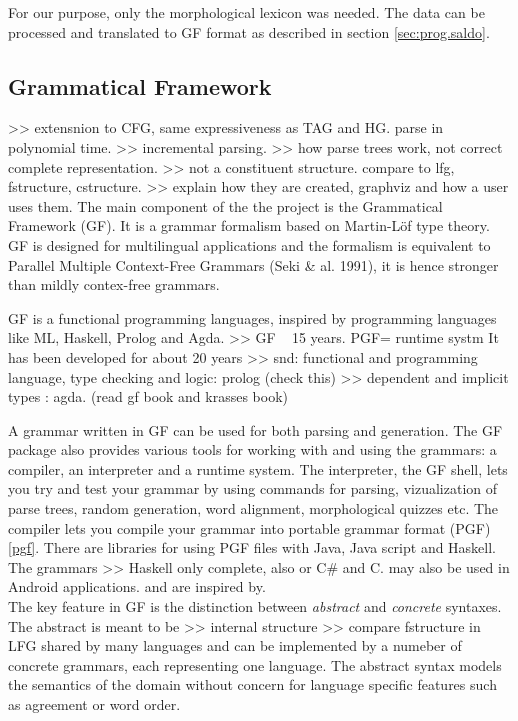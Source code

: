 \documentclass{report}
\begin{document}
For our purpose, only the morphological lexicon was needed.
The data can be processed and translated to GF format as described in 
section \ref{sec:prog.saldo}.

\subsection{Grammatical Framework}
>> extensnion to CFG, same expressiveness as TAG and HG. parse in polynomial time.
>> incremental parsing.
>> how parse trees work, not correct complete representation.
>> not a constituent structure. compare to lfg, fstructure, cstructure.
>> explain how they are created, graphviz and how a user uses them.
The main component of the the project is the Grammatical Framework\cite{gfbok} (GF). It is
a grammar formalism based on Martin-Löf type theory\cite{martinlof}. GF is
designed for multilingual applications and the formalism is equivalent to
Parallel Multiple Context-Free Grammars (Seki \& al. 1991), it is hence
stronger than mildly contex-free grammars. 

GF is a functional programming languages, inspired by programming languages
like ML\cite{ml}, Haskell\cite{haskell}, Prolog\cite{bratko} and
Agda\cite{agda}. 
>> GF ~ 15 years. PGF= runtime systm
It has been developed for about 20 years 
>> snd: functional and programming language, type checking and logic: prolog (check this)
>> dependent and implicit types : agda. (read gf book and krasses book)

A grammar written in GF can be used for both parsing and generation.
The GF package also provides various tools for working with and using the grammars:
a compiler, an interpreter and a runtime system. The interpreter, the GF shell, lets
you try and test your grammar by using commands for parsing, vizualization of parse trees,
random generation, word alignment, morphological quizzes etc.
The compiler lets you compile your grammar into portable grammar format (PGF)\ref{pgf}.
There are libraries for using PGF files with Java, Java script and Haskell. The grammars
>> Haskell only complete, also or C\# and C. 
may also be used in Android applications.
and are inspired by.\\


The key feature in GF is the distinction between
\textit{abstract} and \textit{concrete} syntaxes. The abstract is meant to be
>> internal structure
>> compare fstructure in LFG
shared by many languages and can be implemented by a numeber of concrete grammars,
each representing one language. The abstract syntax models the semantics of the
domain without concern for language specific features such as agreement or word
order.
\end{document}
